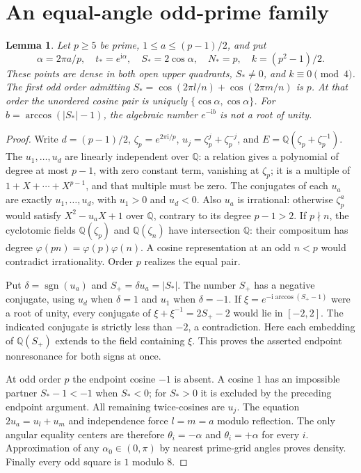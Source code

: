\documentclass[11pt]{article}
\numberwithin{equation}{section}
\newtheorem{lemma}[theorem]{Lemma}
\theoremstyle{remark}\newtheorem{remark}[theorem]{Remark}
\newcommand{\ii}{\mathrm i}
\begin{document}
\section{An equal-angle odd-prime family}
\label{sec:prime-roots}
\begin{lemma}\label{lem:prime-root-family}
Let $p\ge5$ be prime, $1\le a\le(p-1)/2$, and put
\[
 \alpha=2\pi a/p,\quad t_*=e^{\ii\alpha},\quad
 S_*=2\cos\alpha,\quad N_*=p,\quad k=(p^2-1)/2.
\]
These points are dense in both open upper quadrants, $S_*\ne0$,
and $k\equiv0\pmod4$.
The first odd order admitting
$S_*=\cos(2\pi l/n)+\cos(2\pi m/n)$ is $p$.
At that order the unordered cosine pair is uniquely
$\{\cos\alpha,\cos\alpha\}$.
For $b=\arccos(|S_*|-1)$, the algebraic number $e^{-\ii b}$
is not a root of unity.
\end{lemma}
\begin{proof}
Write $d=(p-1)/2$, $\zeta_p=e^{2\pi\ii/p}$,
$u_j=\zeta_p^j+\zeta_p^{-j}$, and
$E=\mathbb Q(\zeta_p+\zeta_p^{-1})$.
The $u_1,\ldots,u_d$ are linearly independent over $\mathbb Q$:
a relation gives a polynomial of degree at most $p-1$, with zero
constant term, vanishing at $\zeta_p$; it is a multiple of
$1+X+\cdots+X^{p-1}$, and that multiple must be zero.
The conjugates of each $u_a$ are exactly $u_1,\ldots,u_d$,
with $u_1>0$ and $u_d<0$.
Also $u_a$ is irrational: otherwise $\zeta_p^a$ would satisfy
$X^2-u_aX+1$ over $\mathbb Q$, contrary to its degree $p-1>2$.
If $p\nmid n$, the cyclotomic fields
$\mathbb Q(\zeta_p)$ and $\mathbb Q(\zeta_n)$ have intersection
$\mathbb Q$: their compositum has degree
$\varphi(pn)=\varphi(p)\varphi(n)$.
A cosine representation at an odd $n<p$ would contradict
irrationality. Order $p$ realizes the equal pair.

Put $\delta=\operatorname{sgn}(u_a)$ and $S_+=\delta u_a=|S_*|$.
The number $S_+$ has a negative conjugate, using $u_d$ when
$\delta=1$ and $u_1$ when $\delta=-1$.
If $\xi=e^{-\ii\arccos(S_+-1)}$ were a root of unity,
every conjugate of $\xi+\xi^{-1}=2S_+-2$ would lie in $[-2,2]$.
The indicated conjugate is strictly less than $-2$, a contradiction.
Here each embedding of $\mathbb Q(S_+)$ extends to the field
containing $\xi$. This proves the asserted endpoint nonresonance
for both signs at once.

At odd order $p$ the endpoint cosine $-1$ is absent.
A cosine $1$ has an impossible partner $S_*-1<-1$ when
$S_*<0$; for $S_*>0$ it is excluded by the preceding endpoint
argument. All remaining twice-cosines are $u_j$.
The equation $2u_a=u_l+u_m$ and independence force $l=m=a$
modulo reflection. The only angular equality centers are therefore
$\theta_i=-\alpha$ and $\theta_i=+\alpha$ for every $i$.
Approximation of any $\alpha_0\in(0,\pi)$ by nearest prime-grid
angles proves density. Finally every odd square is $1$ modulo $8$.
\end{proof}
\end{document}
